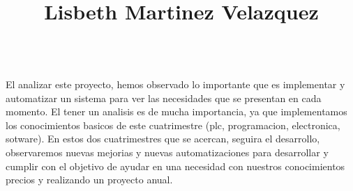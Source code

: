 \documentclass[12pt,a4paper]{article}
\begin{document}
\title{\textbf{Lisbeth Martinez Velazquez}}\\
El analizar este proyecto, hemos observado lo importante que es implementar y automatizar un sistema para ver las necesidades que se presentan en cada momento.
El tener un analisis es de mucha importancia, ya que implementamos los conocimientos basicos de este cuatrimestre (plc, programacion, electronica, sotware).
En estos dos cuatrimestres que se acercan, seguira el desarrollo, observaremos nuevas mejorias y nuevas automatizaciones para desarrollar y cumplir con el objetivo de ayudar en una necesidad con nuestros conocimientos precios y realizando un proyecto anual.\\
\newpage
\nocite{*}


\end{document}
